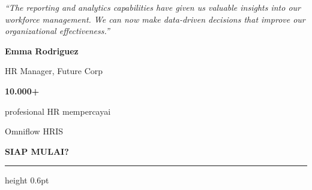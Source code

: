 \documentclass[a4paper]{article}
\newcommand{\sectiontitle}[1]{%
    \vspace{10pt}%
    {\fontsize{13}{16}\selectfont\bfseries\color{BlueDark} #1}\par\vspace{3pt}%
    {\color{BluePrimary}\hrule height 0.6pt}\par\vspace{8pt}%
}
\begin{document}
\noindent
\begin{minipage}[t]{0.485\textwidth}
    \colorbox{BlueBg}{%
        \begin{minipage}{\dimexpr\linewidth-2\fboxsep\relax}
            \vspace{6pt}
            {\fontsize{9.5}{13}\selectfont\color{TextDark}\textit{``The reporting and analytics capabilities have given us valuable insights into our workforce management. We can now make data-driven decisions that improve our organizational effectiveness.''}}\par\vspace{4pt}
            {\fontsize{8.5}{11}\selectfont\bfseries\color{BluePrimary} Emma Rodriguez}\par
            {\fontsize{8}{10}\selectfont\color{TextLight} HR Manager, Future Corp}
            \vspace{6pt}
        \end{minipage}}
\end{minipage}%
\hfill
\begin{minipage}[t]{0.485\textwidth}
    \colorbox{BlueBg}{%
        \begin{minipage}{\dimexpr\linewidth-2\fboxsep\relax}
            \vspace{6pt}
            \begin{center}
                {\fontsize{20}{24}\selectfont\bfseries\color{BluePrimary} 10.000+}\par
                {\fontsize{9.5}{12}\selectfont\color{TextDark} profesional HR mempercayai}\par
                {\fontsize{9.5}{12}\selectfont\color{TextDark} Omniflow HRIS}
            \end{center}
            \vspace{6pt}
        \end{minipage}}
\end{minipage}

\sectiontitle{SIAP MULAI?}
\end{document}
